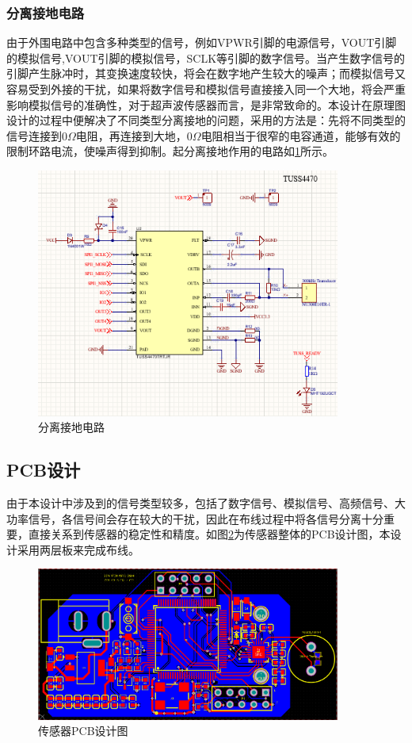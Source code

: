     \subsubsection{分离接地电路}
    由于外围电路中包含多种类型的信号，例如VPWR引脚的电源信号，VOUT引脚的模拟信号,VOUT引脚的模拟信号，SCLK等引脚的数字信号。当产生数字信号的引脚产生脉冲时，其变换速度较快，将会在数字地产生较大的噪声；而模拟信号又容易受到外接的干扰，如果将数字信号和模拟信号直接接入同一个大地，将会严重影响模拟信号的准确性，对于超声波传感器而言，是非常致命的。本设计在原理图设计的过程中便解决了不同类型分离接地的问题，采用的方法是：先将不同类型的信号连接到0$\Omega$电阻，再连接到大地，0$\Omega$电阻相当于很窄的电容通道，能够有效的限制环路电流，使噪声得到抑制。起分离接地作用的电路如\ref{分离接地电路}所示。
     \begin{figure}[ht]
        \centering
        \includegraphics[width=10cm]{figure/TUSS4470 peripheral circuit.png}
        \caption{分离接地电路}
        \label{分离接地电路}
    \end{figure}


    

    
    \subsection{PCB设计}
    由于本设计中涉及到的信号类型较多，包括了数字信号、模拟信号、高频信号、大功率信号，各信号间会存在较大的干扰，因此在布线过程中将各信号分离十分重要，直接关系到传感器的稳定性和精度。如图\ref{传感器PCB设计图}为传感器整体的PCB设计图，本设计采用两层板来完成布线。
      \begin{figure}[ht]
        \centering
        \includegraphics[width=10cm]{figure/overall pcb}
        \caption{传感器PCB设计图}
        \label{传感器PCB设计图}
    \end{figure}
    
